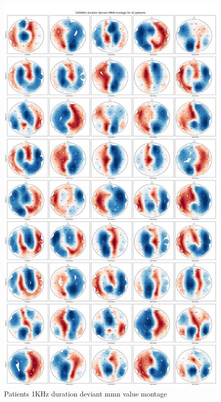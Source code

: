 \documentclass[10pt]{article}
\begin{document}
\begin{figure}[H]
  \includegraphics[width=16cm]{../../../data_analysis_results/MMN/montage/Patient/1KHz_duration_deviant_montage.png}
  \caption{Patients 1KHz duration deviant \gls{mmn} value montage}\label{patient_1KHz_mmn_montage}
\end{figure}
\end{document}
